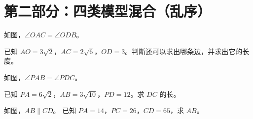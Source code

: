 \documentclass{exam-zh}
\begin{document}
\section*{第二部分：四类模型混合（乱序）}


\begin{problem}[points=10]
  \noindent
  \begin{minipage}[t]{\dimexpr\linewidth-60mm-6mm\relax}
    \vspace{0pt}
    如图，$\angle OAC=\angle ODB$。

已知 $AO=3\sqrt{2}$，$AC=2\sqrt{6}$，$OD=3$。判断还可以求出哪条边，并求出它的长度。
    
  \end{minipage}\hfill
  \begin{diagramcoltikz}{60mm}{}
  }
  \end{diagramcoltikz}
  \par\medskip
  \answerarea[54mm]
\end{problem}



\begin{problem}[points=10]
  \noindent
  \begin{minipage}[t]{\dimexpr\linewidth-60mm-6mm\relax}
    \vspace{0pt}
    如图，$\angle PAB=\angle PDC$。

已知 $PA=6\sqrt{2}$，$AB=3\sqrt{10}$，$PD=12$。求 $DC$ 的长。
    
  \end{minipage}\hfill
  \begin{diagramcoltikz}{60mm}{}
  }
  \end{diagramcoltikz}
  \par\medskip
  \answerarea[54mm]
\end{problem}



\begin{problem}[points=10]
  \noindent
  \begin{minipage}[t]{\dimexpr\linewidth-60mm-6mm\relax}
    \vspace{0pt}
    如图，$AB\parallel CD$。
已知 $PA=14$，$PC=26$，$CD=65$，求 $AB$。
    
  \end{minipage}\hfill
  \begin{diagramcoltikz}{60mm}{}
  }
  \end{diagramcoltikz}
  \par\medskip
  \answerarea[42mm]
\end{problem}
\end{document}
